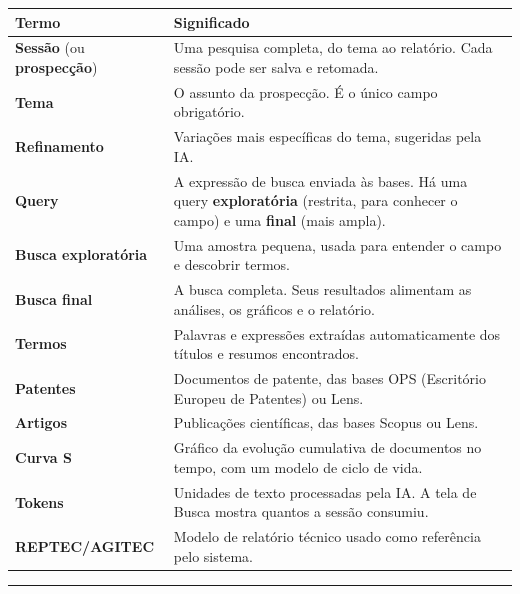 \documentclass[
  brazilian,
  a4paper,12pt,oneside]{report}
\newcounter{none} %
\begin{document}
{\def\LTcaptype{none} %
\begin{longtable}[]{@{}
  >{\raggedright\arraybackslash}p{}
  >{\raggedright\arraybackslash}p{}@{}}
\toprule\noalign{}
\begin{minipage}[b]{\linewidth}\raggedright
Termo
\end{minipage} & \begin{minipage}[b]{\linewidth}\raggedright
Significado
\end{minipage} \\
\midrule\noalign{}
\endhead
\bottomrule\noalign{}
\endlastfoot
\textbf{Sessão} (ou \textbf{prospecção}) & Uma pesquisa completa, do
tema ao relatório. Cada sessão pode ser salva e retomada. \\
\textbf{Tema} & O assunto da prospecção. É o único campo obrigatório. \\
\textbf{Refinamento} & Variações mais específicas do tema, sugeridas
pela IA. \\
\textbf{Query} & A expressão de busca enviada às bases. Há uma query
\textbf{exploratória} (restrita, para conhecer o campo) e uma
\textbf{final} (mais ampla). \\
\textbf{Busca exploratória} & Uma amostra pequena, usada para entender o
campo e descobrir termos. \\
\textbf{Busca final} & A busca completa. Seus resultados alimentam as
análises, os gráficos e o relatório. \\
\textbf{Termos} & Palavras e expressões extraídas automaticamente dos
títulos e resumos encontrados. \\
\textbf{Patentes} & Documentos de patente, das bases OPS (Escritório
Europeu de Patentes) ou Lens. \\
\textbf{Artigos} & Publicações científicas, das bases Scopus ou Lens. \\
\textbf{Curva S} & Gráfico da evolução cumulativa de documentos no
tempo, com um modelo de ciclo de vida. \\
\textbf{Tokens} & Unidades de texto processadas pela IA. A tela de Busca
mostra quantos a sessão consumiu. \\
\textbf{REPTEC/AGITEC} & Modelo de relatório técnico usado como
referência pelo sistema. \\
\end{longtable}
}

\begin{center}\rule{0.5\linewidth}{0.5pt}\end{center}
\end{document}
